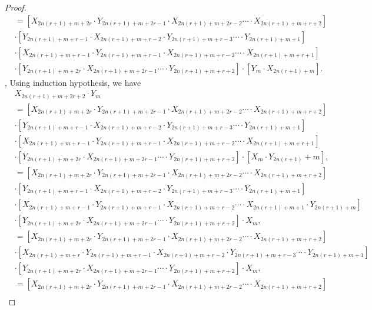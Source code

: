 \begin{proof}
\begin{align*}
&=\left[X_{2n(r+1)+m+2r}\cdot Y_{2n(r+1)+m+2r-1}\cdot X_{2n(r+1)+m+2r-2}\cdots\cdot X_{2n(r+1)+m+r+2}\right]\\
&\cdot\left[Y_{2n(r+1)+m+r-1}\cdot X_{2n(r+1)+m+r-2}\cdot Y_{2n(r+1)+m+r-3}\cdots\cdot Y_{2n(r+1)+m+1}\right]\\
&\cdot\left[X_{2n(r+1)+m+r-1}\cdot Y_{2n(r+1)+m+r-1}\cdot X_{2n(r+1)+m+r-2}\cdots\cdot X_{2n(r+1)+m+r+1}\right]\\&\cdot\left[Y_{2n(r+1)+m+2r}\cdot X_{2n(r+1)+m+2r-1}\cdots\cdot Y_{2n(r+1)+m+r+2}\right]\cdot \left[Y_{m}\cdot X_{2n(r+1)+m}\right].
\end{align*},
Using induction hypothesis, we have
\begin{align*}
&X_{2n(r+1)+m+2r+2}\cdot Y_{m}\\&=\left[X_{2n(r+1)+m+2r}\cdot Y_{2n(r+1)+m+2r-1}\cdot X_{2n(r+1)+m+2r-2}\cdots\cdot X_{2n(r+1)+m+r+2}\right]\\
&\cdot\left[Y_{2n(r+1)+m+r-1}\cdot X_{2n(r+1)+m+r-2}\cdot Y_{2n(r+1)+m+r-3}\cdots\cdot Y_{2n(r+1)+m+1}\right]\\
&\cdot\left[X_{2n(r+1)+m+r-1}\cdot Y_{2n(r+1)+m+r-1}\cdot X_{2n(r+1)+m+r-2}\cdots\cdot X_{2n(r+1)+m+r+1}\right]\\&\cdot\left[Y_{2n(r+1)+m+2r}\cdot X_{2n(r+1)+m+2r-1}\cdots\cdot Y_{2n(r+1)+m+r+2}\right]\cdot \left[X_{m}\cdot Y_{2n(r+1)}+m\right],\\
&=\left[X_{2n(r+1)+m+2r}\cdot Y_{2n(r+1)+m+2r-1}\cdot X_{2n(r+1)+m+2r-2}\cdots\cdot X_{2n(r+1)+m+r+2}\right]\\
&\cdot\left[Y_{2n(r+1)+m+r-1}\cdot X_{2n(r+1)+m+r-2}\cdot Y_{2n(r+1)+m+r-3}\cdots\cdot Y_{2n(r+1)+m+1}\right]\\
&\cdot\left[X_{2n(r+1)+m+r-1}\cdot Y_{2n(r+1)+m+r-1}\cdot X_{2n(r+1)+m+r-2}\cdots\cdot X_{2n(r+1)+m+1}\cdot Y_{2n(r+1)+m}\right]\\
&\cdot\left[Y_{2n(r+1)+m+2r}\cdot X_{2n(r+1)+m+2r-1}\cdots\cdot Y_{2n(r+1)+m+r+2}\right]\cdot X_{m},\\
&=\left[X_{2n(r+1)+m+2r}\cdot Y_{2n(r+1)+m+2r-1}\cdot X_{2n(r+1)+m+2r-2}\cdots\cdot X_{2n(r+1)+m+r+2}\right]\\
&\cdot\left[X_{2n(r+1)+m+r}\cdot Y_{2n(r+1)+m+r-1}\cdot X_{2n(r+1)+m+r-2}\cdot Y_{2n(r+1)+m+r-3}\cdots\cdot Y_{2n(r+1)+m+1}\right]\\
&\cdot\left[Y_{2n(r+1)+m+2r}\cdot X_{2n(r+1)+m+2r-1}\cdots\cdot Y_{2n(r+1)+m+r+2}\right]\cdot X_{m},\\
&=\left[X_{2n(r+1)+m+2r}\cdot Y_{2n(r+1)+m+2r-1}\cdot X_{2n(r+1)+m+2r-2}\cdots\cdot X_{2n(r+1)+m+r+2}\right]\\

\end{align*}
\end{proof}
